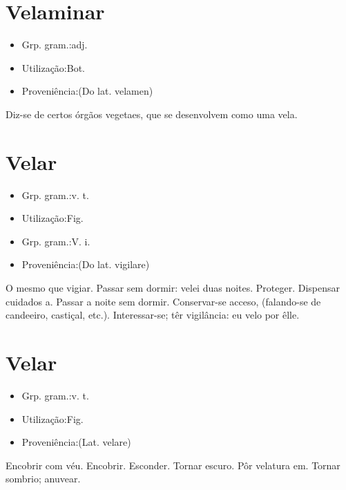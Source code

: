 \documentclass{article}
\begin{document}
\section{Velaminar}
\begin{itemize}
\item {Grp. gram.:adj.}
\end{itemize}
\begin{itemize}
\item {Utilização:Bot.}
\end{itemize}
\begin{itemize}
\item {Proveniência:(Do lat. \textunderscore velamen\textunderscore )}
\end{itemize}
Diz-se de certos órgãos vegetaes, que se desenvolvem como uma vela.
\section{Velar}
\begin{itemize}
\item {Grp. gram.:v. t.}
\end{itemize}
\begin{itemize}
\item {Utilização:Fig.}
\end{itemize}
\begin{itemize}
\item {Grp. gram.:V. i.}
\end{itemize}
\begin{itemize}
\item {Proveniência:(Do lat. \textunderscore vigilare\textunderscore )}
\end{itemize}
O mesmo que \textunderscore vigiar\textunderscore .
Passar sem dormir: \textunderscore velei duas noites\textunderscore .
Proteger.
Dispensar cuidados a.
Passar a noite sem dormir.
Conservar-se acceso, (falando-se de candeeiro, castiçal, etc.).
Interessar-se; têr vigilância: \textunderscore eu velo por êlle\textunderscore .
\section{Velar}
\begin{itemize}
\item {Grp. gram.:v. t.}
\end{itemize}
\begin{itemize}
\item {Utilização:Fig.}
\end{itemize}
\begin{itemize}
\item {Proveniência:(Lat. \textunderscore velare\textunderscore )}
\end{itemize}
Encobrir com véu.
Encobrir.
Esconder.
Tornar escuro.
Pôr velatura em.
Tornar sombrio; anuvear.
\end{document}
